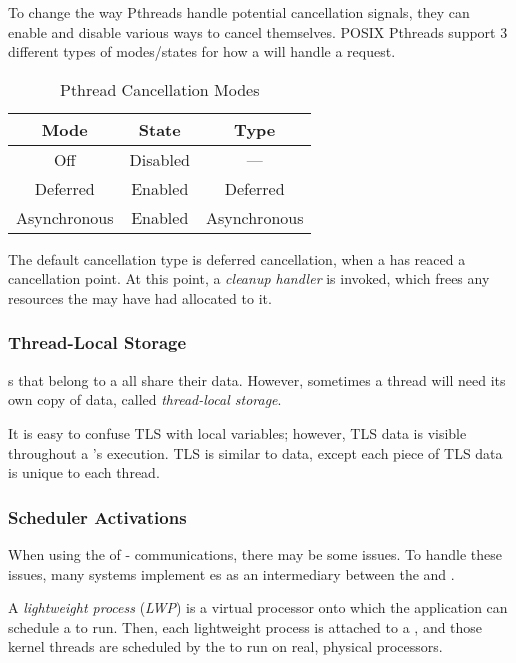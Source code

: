 To change the way Pthreads handle potential cancellation signals, they can enable and disable various ways to cancel themselves.
POSIX Pthreads support 3 different types of modes/states for how a  will handle a request.
\begin{table}[h!tbp]
  \centering
  \begin{tabular}{ccc}
    \toprule
    Mode & State & Type \\
    \midrule
    Off & Disabled & --- \\
    Deferred & Enabled & Deferred \\
    Asynchronous & Enabled & Asynchronous \\
    \bottomrule
  \end{tabular}
  \caption{Pthread Cancellation Modes}
  \label{tab:Pthread_Cancellation_Modes}
\end{table}

The default cancellation type is deferred cancellation, when a  has reaced a cancellation point.
At this point, a \emph{cleanup handler} is invoked, which frees any resources the  may have had allocated to it.

\subsubsection{Thread-Local Storage}\label{subsubsec:Thread_Local_Storage}
s that belong to a  all share their data.
However, sometimes a thread will need its own copy of data, called \emph{thread-local storage}.

\begin{blackbox}
  It is easy to confuse TLS with local variables; however, TLS data is visible throughout a 's execution.
  TLS is similar to  data, except each piece of TLS data is unique to each thread.
\end{blackbox}

\subsubsection{Scheduler Activations}\label{subsubsec:Scheduler_Activations}
When using the  of - communications, there may be some issues.
To handle these issues, many systems implement es as an intermediary between the  and .

\begin{definition}\label{def:Lightweight_Process}
  A \emph{lightweight process} (\emph{LWP}) is a virtual processor onto which the application can schedule a  to run.
  Then, each lightweight process is attached to a , and those kernel threads are scheduled by the  to run on real, physical processors.
\end{definition}



